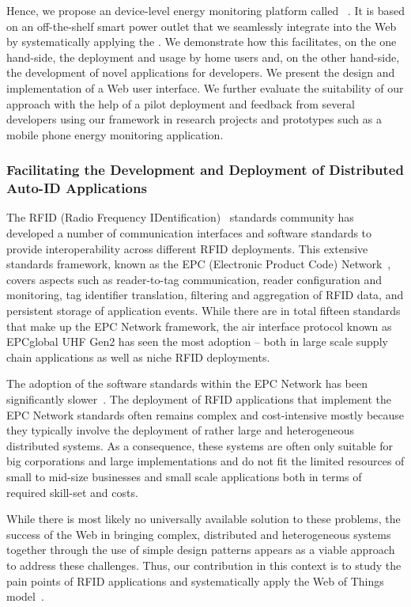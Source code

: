 Hence, we propose an  device-level energy monitoring platform called ~\cite{Guinard2009a,Guinard2010-WoT,Weiss2010}. It is based on an off-the-shelf smart power outlet that we seamlessly integrate into the Web by systematically applying the \WoTA{}. We demonstrate how this facilitates, on the one hand-side, the deployment and usage by home users and, on the other hand-side, the development of novel applications for developers. We present the design and implementation of a Web user interface. We further evaluate the suitability of our approach with the help of a pilot deployment and feedback from several developers using our framework in research projects and prototypes such as a mobile phone energy monitoring application.


\subsubsection{Facilitating the Development and Deployment of Distributed Auto-ID Applications}
The RFID (Radio Frequency IDentification)~\cite{Sarma2001,Finkenzeller2010} standards community has developed a number of communication interfaces and software standards to provide interoperability across different RFID deployments. This extensive standards framework, known as the EPC (Electronic Product Code) Network~\cite{Sarma2001a}, covers aspects such as reader-to-tag communication, reader configuration and monitoring, tag identifier translation, filtering and aggregation of RFID data, and persistent storage of application events.  While there are in total fifteen standards that make up the EPC Network framework, the air interface protocol known as EPCglobal UHF Gen2 has seen the most adoption -- both in large scale supply chain applications as well as niche RFID deployments. 

The adoption of the software standards within the EPC Network has been significantly slower~\cite{Schmitt2008,Guinard2011}. The deployment of RFID applications that implement the EPC Network standards often remains complex and cost-intensive mostly because they typically involve the deployment of rather large and heterogeneous distributed systems. As a consequence, these systems are often only suitable for big corporations and large implementations and do not fit the limited resources of small to mid-size businesses and small scale applications both in terms of required skill-set and costs. 

While there is most likely no universally available solution to these problems, the success of the Web in bringing complex, distributed and heterogeneous systems together through the use of simple design patterns appears as a viable approach to address these challenges. Thus, our contribution in this context is to study the pain points of RFID applications and systematically apply the Web of Things model~\cite{Guinard2010d,Guinard2011}.

